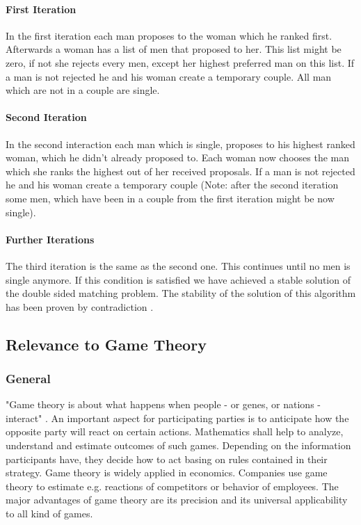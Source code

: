 \paragraph{First Iteration\\}
In the first iteration each man proposes to the woman which he ranked first.
Afterwards a woman has a list of men that proposed to her. This list might be zero, if not she rejects every men, except her highest preferred man on this list.
If a man is not rejected he and his woman create a temporary couple.
All man which are not in a couple are single.

\paragraph{Second Iteration\\}
In the second interaction each man which is single, proposes to his highest ranked woman, which he didn't already proposed to.
Each woman now chooses the man which she ranks the highest out of her received proposals.
If a man is not rejected he and his woman create a temporary couple (Note: after the second iteration some men, which have been in a couple from the first iteration might be now single).

\paragraph{Further Iterations\\}
The third iteration is the same as the second one.
This continues until no men is single anymore.
If this condition is satisfied we have achieved a stable solution of the double sided matching problem.
The stability of the solution of this algorithm has been proven by contradiction \cite{gale62a}.

\subsection{Relevance to Game Theory}

\subsubsection{General}
"Game theory is about what happens when people - or genes, or nations - interact" \cite[p. 1]{camerer2003behavioral}.
An important aspect for participating parties is to anticipate how the opposite party will react on certain actions.
Mathematics shall help to analyze, understand and estimate outcomes of such games. 
Depending on the information participants have, they decide how to act basing on rules contained in their strategy.
Game theory is widely applied in economics.
Companies use game theory to estimate e.g. reactions of competitors or behavior of employees.
The major advantages of game theory are its precision and its universal applicability to all kind of games. \cite[p. 1ff]{camerer2003behavioral}

